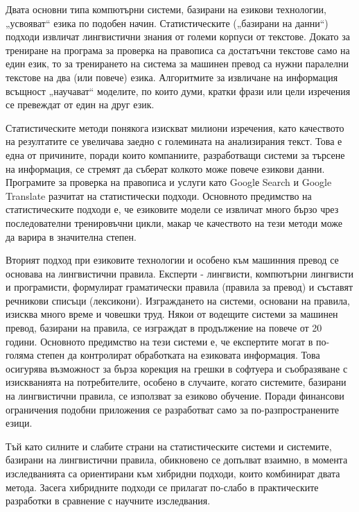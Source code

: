 \documentclass[]{../../metanetpaper}
\begin{document}
\begin{multicols}{2}

Двата основни типа компютърни системи, базирани на езикови технологии, „усвояват“ езика по подобен начин. Статистическите („базирани на данни“) подходи извличат
 лингвистични знания от големи корпуси от текстове. Докато  за трениране на програма за проверка на правописа са достатъчни текстове само на един език, то за тренирането на система за машинен превод са нужни паралелни текстове на два (или повече) езика. Алгоритмите за извличане на информация всъщност „научават“ моделите, по които думи, кратки
 фрази или цели изречения се превеждат от един на друг език. 

Статистическите методи понякога изискват милиони изречения, като качеството на резултатите се увеличава заедно с големината на анализирания
 текст. Това е една от причините, поради които компаниите, разработващи системи за търсене на информация, се стремят да съберат колкото
 може повече езикови данни. Програмите за проверка на
 правописа и услуги като Googlе Search и Google Translate разчитат на статистически подходи. Основното предимство на статистическите подходи е, че езиковите модели се извличат много бързо чрез последователни тренировъчни цикли, макар че качеството на тези методи може да варира в значителна степен.

Вторият подход при езиковите технологии и особено към машинния превод се основава на лингвистични правила. Експерти - лингвисти, компютърни лингвисти и програмисти, формулират  граматически правила (правила за превод) и съставят
 речникови списъци (лексикони). Изграждането на системи, основани на правила, изисква много време и човешки труд. 
Някои от водещите системи за машинен превод, базирани на правила, се
 изграждат в продължение на повече от 20 години. Основното предимство
 на тези системи е, че експертите могат в по-голяма степен да контролират обработката на езиковата информация. 
Това осигурява възможност за бърза корекция на грешки в софтуера и
съобразяване с изискванията на потребителите, особено в случаите, когато системите, базирани на лингвистични правила, се използват за езиково обучение.
Поради финансови ограничения подобни приложения се разработват само за
 по-разпространените езици.

Тъй като силните и слабите страни на статистическите системи и системите, базирани на лингвистични правила, обикновено се допълват взаимно, в момента изследванията са ориентирани към хибридни подходи, които комбинират  двата метода. Засега хибридните подходи се прилагат по-слабо в практическите разработки в сравнение с научните изследвания. 


\end{multicols}
\end{document}
